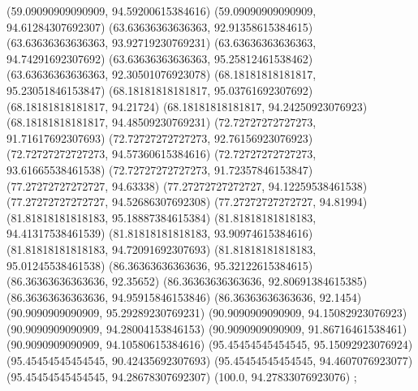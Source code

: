 {{{		(59.09090909090909, 94.59200615384616)
		(59.09090909090909, 94.61284307692307)
		(63.63636363636363, 92.91358615384615)
		(63.63636363636363, 93.92719230769231)
		(63.63636363636363, 94.74291692307692)
		(63.63636363636363, 95.25812461538462)
		(63.63636363636363, 92.30501076923078)
		(68.18181818181817, 95.23051846153847)
		(68.18181818181817, 95.03761692307692)
		(68.18181818181817, 94.21724)
		(68.18181818181817, 94.24250923076923)
		(68.18181818181817, 94.48509230769231)
		(72.72727272727273, 91.71617692307693)
		(72.72727272727273, 92.76156923076923)
		(72.72727272727273, 94.57360615384616)
		(72.72727272727273, 93.61665538461538)
		(72.72727272727273, 91.72357846153847)
		(77.27272727272727, 94.63338)
		(77.27272727272727, 94.12259538461538)
		(77.27272727272727, 94.52686307692308)
		(77.27272727272727, 94.81994)
		(81.81818181818183, 95.18887384615384)
		(81.81818181818183, 94.41317538461539)
		(81.81818181818183, 93.90974615384616)
		(81.81818181818183, 94.72091692307693)
		(81.81818181818183, 95.01245538461538)
		(86.36363636363636, 95.32122615384615)
		(86.36363636363636, 92.35652)
		(86.36363636363636, 92.80691384615385)
		(86.36363636363636, 94.95915846153846)
		(86.36363636363636, 92.1454)
		(90.9090909090909, 95.29289230769231)
		(90.9090909090909, 94.15082923076923)
		(90.9090909090909, 94.28004153846153)
		(90.9090909090909, 91.86716461538461)
		(90.9090909090909, 94.10580615384616)
		(95.45454545454545, 95.15092923076924)
		(95.45454545454545, 90.42435692307693)
		(95.45454545454545, 94.4607076923077)
		(95.45454545454545, 94.28678307692307)
		(100.0, 94.27833076923076)
	};

}}
